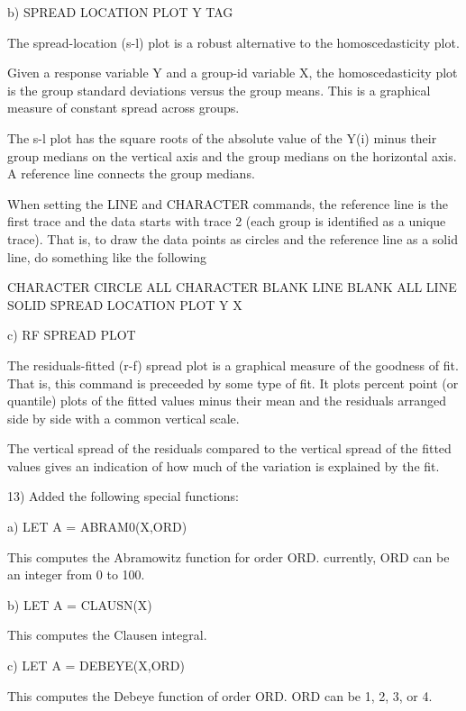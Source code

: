 {    b) SPREAD LOCATION PLOT Y TAG

       The spread-location (s-l) plot is a robust alternative to
       the homoscedasticity plot.

       Given a response variable Y and a group-id variable X, 
       the homoscedasticity plot is the group standard deviations
       versus the group means.  This is a graphical measure of
       constant spread across groups.

       The s-l plot has the square roots of the absolute value of
       the Y(i) minus their group medians on the vertical axis and
       the group medians on the horizontal axis.  A reference line
       connects the group medians.

       When setting the LINE and CHARACTER commands, the reference
       line is the first trace and the data starts with trace 2
       (each group is identified as a unique trace).  That is, to
       draw the data points as circles and the reference line as a
       solid line, do something like the following

           CHARACTER CIRCLE ALL
           CHARACTER BLANK
           LINE BLANK ALL
           LINE SOLID
           SPREAD LOCATION PLOT Y X

    c) RF SPREAD PLOT

       The residuals-fitted (r-f) spread plot is a graphical measure
       of the goodness of fit.  That is, this command is preceeded
       by some type of fit.  It plots percent point (or quantile)
       plots of the fitted values minus their mean and the residuals
       arranged side by side with a common vertical scale.

       The vertical spread of the residuals compared to the vertical
       spread of the fitted values gives an indication of how much
       of the variation is explained by the fit.

13) Added the following special functions:

    a) LET A = ABRAM0(X,ORD)
 
       This computes the Abramowitz function for order ORD.
       currently, ORD can be an integer from 0 to 100.

    b) LET A = CLAUSN(X)
 
       This computes the Clausen integral.

    c) LET A = DEBEYE(X,ORD)
 
       This computes the Debeye function of order ORD.  ORD
       can be 1, 2, 3, or 4.

}
